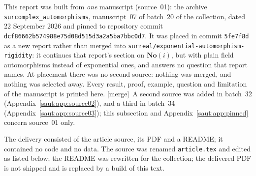 \documentclass[11pt]{article}
\theoremstyle{definition}
\theoremstyle{remark}
\newcommand{\No}{\mathbf{No}}
\newcommand{\repoSHA}{\texttt{dcf86662\allowbreak b574988e\allowbreak 75d08d51\allowbreak 5d3a2a5b\allowbreak a7bbc0d7}}
\newcommand{\repo}[1]{\nolinkurl{#1}}%
\newcommand{\mergetag}{\textup{[merge]}}
\numberwithin{equation}{section}
\begin{document}
This report was built from \emph{one} manuscript (source~01): the archive
\texttt{surcomplex\_automorphisms}, manuscript~07 of batch~20 of the
collection, dated 22 September 2026 and pinned to repository commit
\repoSHA. It was placed in
commit \texttt{5fe7f8d} as a new report rather than merged into
\repo{surreal/exponential-automorphism-rigidity}: it continues that report's
section on $\No(i)$, but with plain field automorphisms instead of
exponential ones, and answers no question that report names. At placement
there was no second source: nothing was merged, and nothing was selected away.
Every result, proof, example, question and limitation of the manuscript is
printed here. \mergetag\ A second source was added in batch~32
(Appendix~\ref{saut:app:source02}), and a third in batch~34
(Appendix~\ref{saut:app:source03}); this subsection and
Appendix~\ref{saut:app:pinned} concern source~01 only.

The delivery consisted of the article source, its PDF and a README; it
contained no code and no data. The source was renamed \texttt{article.tex}
and edited as listed below; the README was rewritten for the collection;
the delivered PDF is not shipped and is replaced by a build of this text.
\end{document}
